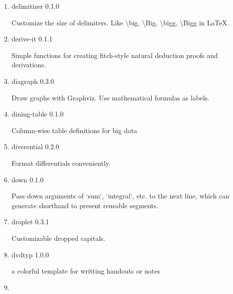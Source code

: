 \begin{enumerate}
  { delegis } { 0.3.0 }

  A package and template for drafting legislative content in a
  German-style structuring, such as for bylaws, etc.
\item
  \href{/universe/package/delimitizer/}{}

  { delimitizer } { 0.1.0 }

  Customize the size of delimiters. Like \textbackslash big,
  \textbackslash Big, \textbackslash bigg, \textbackslash Bigg in LaTeX.
\item
  \href{/universe/package/derive-it/}{}

  { derive-it } { 0.1.1 }

  Simple functions for creating fitch-style natural deduction proofs and
  derivations.
\item
  \href{/universe/package/diagraph/}{}

  { diagraph } { 0.3.0 }

  Draw graphs with Graphviz. Use mathematical formulas as labels.
\item
  \href{/universe/package/dining-table/}{}

  { dining-table } { 0.1.0 }

  Column-wise table definitions for big data
\item
  \href{/universe/package/diverential/}{}

  { diverential } { 0.2.0 }

  Format differentials conveniently.
\item
  \href{/universe/package/down/}{}

  { down } { 0.1.0 }

  Pass down arguments of `sum`, `integral`, etc. to the next line, which
  can generate shorthand to present reusable segments.
\item
  \href{/universe/package/droplet/}{}

  { droplet } { 0.3.1 }

  Customizable dropped capitals.
\item
  \href{/universe/package/dvdtyp/}{}


  { dvdtyp } { 1.0.0 }

  a colorful template for writting handouts or notes
\item
  \href{/universe/package/easy-pinyin/}{}


\end{enumerate}
